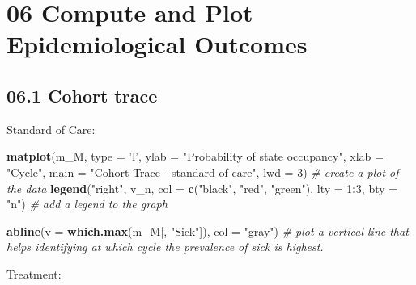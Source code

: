 \documentclass[
]{article}
\newenvironment{Shaded}{\begin{snugshade}}{\end{snugshade}}
\newcommand{\CommentTok}[1]{\textcolor[rgb]{0.56,0.35,0.01}{\textit{#1}}}
\newcommand{\DataTypeTok}[1]{\textcolor[rgb]{0.13,0.29,0.53}{#1}}
\newcommand{\DecValTok}[1]{\textcolor[rgb]{0.00,0.00,0.81}{#1}}
\newcommand{\KeywordTok}[1]{\textcolor[rgb]{0.13,0.29,0.53}{\textbf{#1}}}
\newcommand{\NormalTok}[1]{#1}
\newcommand{\OperatorTok}[1]{\textcolor[rgb]{0.81,0.36,0.00}{\textbf{#1}}}
\newcommand{\StringTok}[1]{\textcolor[rgb]{0.31,0.60,0.02}{#1}}
\begin{document}
\hypertarget{compute-and-plot-epidemiological-outcomes}{%
\section{06 Compute and Plot Epidemiological
Outcomes}\label{compute-and-plot-epidemiological-outcomes}}

\hypertarget{cohort-trace-1}{%
\subsection{06.1 Cohort trace}\label{cohort-trace-1}}

Standard of Care:

\begin{Shaded}
\begin{Highlighting}[]
\KeywordTok{matplot}\NormalTok{(m_M, }\DataTypeTok{type =} \StringTok{'l'}\NormalTok{, }
        \DataTypeTok{ylab =} \StringTok{"Probability of state occupancy"}\NormalTok{,}
        \DataTypeTok{xlab =} \StringTok{"Cycle"}\NormalTok{,}
        \DataTypeTok{main =} \StringTok{"Cohort Trace - standard of care"}\NormalTok{, }\DataTypeTok{lwd =} \DecValTok{3}\NormalTok{)  }\CommentTok{# create a plot of the data}
\KeywordTok{legend}\NormalTok{(}\StringTok{"right"}\NormalTok{, v_n, }\DataTypeTok{col =} \KeywordTok{c}\NormalTok{(}\StringTok{"black"}\NormalTok{, }\StringTok{"red"}\NormalTok{, }\StringTok{"green"}\NormalTok{), }
       \DataTypeTok{lty =} \DecValTok{1}\OperatorTok{:}\DecValTok{3}\NormalTok{, }\DataTypeTok{bty =} \StringTok{"n"}\NormalTok{)                            }\CommentTok{# add a legend to the graph}

\KeywordTok{abline}\NormalTok{(}\DataTypeTok{v =} \KeywordTok{which.max}\NormalTok{(m_M[, }\StringTok{"Sick"}\NormalTok{]), }\DataTypeTok{col =} \StringTok{"gray"}\NormalTok{)      }\CommentTok{# plot a vertical line that helps identifying at which cycle the prevalence of sick is highest.  }
\end{Highlighting}
\end{Shaded}

Treatment:
\end{document}
